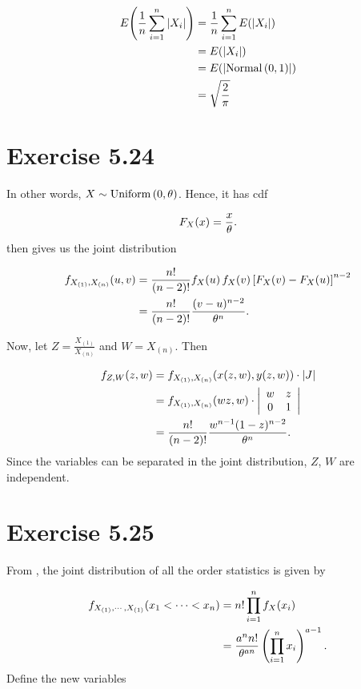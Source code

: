 \documentclass[12pt,letterpaper,reqno]{amsart}
\numberwithin{equation}{subsection}
\begin{document}
\begin{align*}
    {E}\! \left( {\frac{1}{n} \sum_{i=1}^n \left\lvert{X_i}\right\rvert} \right) &= \frac{1}{n} \sum_{i=1}^n {E}\! \left( {\left\lvert{X_i}\right\rvert} \right) \\
    &= {E}\! \left( {\left\lvert{X_i}\right\rvert} \right) \\
    &= {E}\! \left( {\left\lvert{\operatorname{Normal}\left( {0,1} \right)}\right\rvert} \right) \\
    &= \sqrt{\frac{2}{\pi}}
\end{align*}

\newpage
\section{Exercise 5.24}

In other words, $X \sim \operatorname{Uniform}\left( {0, \theta} \right)$. Hence, it has cdf

\[ {F_{X}}\! \left( {x} \right) = \frac{x}{\theta}. \]
\cite[Theorem 5.4.6 page 230]{Berger-Casella} then gives us the joint distribution

\begin{align}
    {f_{X_{(1)}, X_{(n)}}}\! \left( {u, v} \right) &= \frac{n!}{(n-2)!} {f_X}\! \left( {u} \right) {f_X}\! \left( {v} \right) \left[ {F_X}\! \left( {v} \right) - {F_X}\! \left( {u} \right) \right]^{n-2} \nonumber \\
    &= \frac{n!}{(n-2)!} \frac{(v-u)^{n-2}}{\theta^n}.
\end{align}

Now, let $Z = \frac{X_{(1)}}{X_{(n)}}$ and $W = X_{(n)}$. Then

\begin{align*}
    {f_{Z,W}}\! \left( {z,w} \right) &= {f_{X_{(1)}, X_{(n)}}}\! \left( {x(z,w), y(z,w)} \right) \cdot \left\lvert{J}\right\rvert \\
    &= {f_{X_{(1)}, X_{(n)}}}\! \left( {wz, w} \right) \cdot \left\vert \begin{array}{cc}
         w & z  \\
         0 & 1
    \end{array} \right\vert \\
    &= \frac{n!}{(n-2)!} \frac{w^{n-1} (1-z)^{n-2}}{\theta^n}.
\end{align*}
Since the variables can be separated in the joint distribution, $Z$, $W$ are independent.

\newpage
\section{Exercise 5.25}

From \cite[page 230]{Berger-Casella}, the joint distribution of all the order statistics is given by

\begin{align}
    {f_{{X}_{\left( {1} \right)}, \cdots, {X}_{\left( {1} \right)}}}\! \left( {x_1 < \cdots < x_n} \right) &= n! \prod_{i=1}^n {f_X}\! \left( {x_i} \right) \nonumber \\
    &= \frac{a^n n!}{\theta^{an}} \left(\prod_{i=1}^n x_i \right)^{a-1}.
\end{align}
Define the new variables
\end{document}
